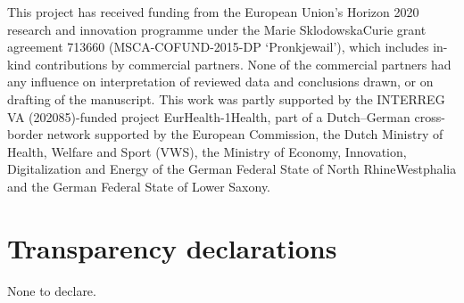 This project has received funding from the European Union’s Horizon
2020 research and innovation programme under the Marie SklodowskaCurie grant agreement 713660 (MSCA-COFUND-2015-DP ‘Pronkjewail’),
which includes in-kind contributions by commercial partners. None of
the commercial partners had any influence on interpretation of reviewed
data and conclusions drawn, or on drafting of the manuscript. This work
was partly supported by the INTERREG VA (202085)-funded project
EurHealth-1Health, part of a Dutch–German cross-border network supported by the European Commission, the Dutch Ministry of Health,
Welfare and Sport (VWS), the Ministry of Economy, Innovation,
Digitalization and Energy of the German Federal State of North RhineWestphalia and the German Federal State of Lower Saxony.

\section{Transparency declarations}

None to declare.